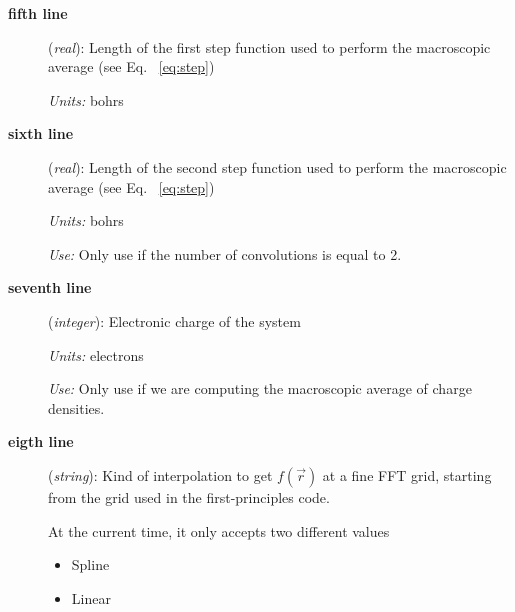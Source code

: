 \begin{description}
 \item[{\bf fifth line}] ({\it real}): 
      Length of the first step function used to perform
      the macroscopic average (see Eq. ~\ref{eq:step})

      {\it Units:} bohrs

 \item[{\bf sixth line}] ({\it real}): 
      Length of the second step function used to perform
      the macroscopic average (see Eq. ~\ref{eq:step})

      {\it Units:} bohrs

      {\it Use:} Only use if the number of convolutions is equal to 2. 

 \item[{\bf seventh line}] ({\it integer}):
      Electronic charge of the system

      {\it Units:} electrons

      {\it Use:} Only use if we are computing the macroscopic average of
                 charge densities. 

 \item[{\bf eigth line}] ({\it string}):
      Kind of interpolation to get $f \left( \vec{r} \right)$
      at a fine FFT grid, starting from the grid used 
      in the first-principles code.

      At the current time, it only accepts two different values

      \begin{itemize}
         \item Spline
         \item Linear
      \end{itemize}

 \end{description}


%
%

